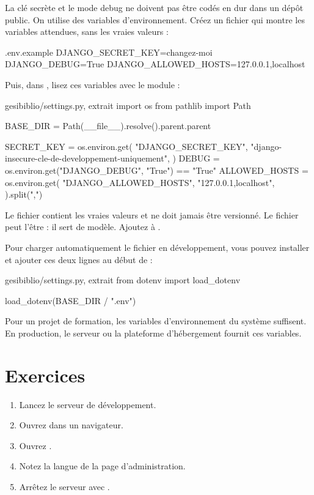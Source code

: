 La clé secrète et le mode debug ne doivent pas être codés en dur dans un dépôt
public. On utilise des variables d'environnement. Créez un fichier
 qui montre les variables attendues, sans les vraies valeurs :

\begin{codebox}[tree]{.env.example}
DJANGO_SECRET_KEY=changez-moi
DJANGO_DEBUG=True
DJANGO_ALLOWED_HOSTS=127.0.0.1,localhost
\end{codebox}

Puis, dans , lisez ces variables avec le module  :

\begin{codebox}[python]{gesibiblio/settings.py, extrait}
import os
from pathlib import Path

BASE_DIR = Path(__file__).resolve().parent.parent

SECRET_KEY = os.environ.get(
    "DJANGO_SECRET_KEY",
    "django-insecure-cle-de-developpement-uniquement",
)
DEBUG = os.environ.get("DJANGO_DEBUG", "True") == "True"
ALLOWED_HOSTS = os.environ.get(
    "DJANGO_ALLOWED_HOSTS",
    "127.0.0.1,localhost",
).split(",")
\end{codebox}

\begin{attention}
Le fichier  contient les vraies valeurs et ne doit jamais être
versionné. Le fichier  peut l'être : il sert de modèle. Ajoutez
 à .
\end{attention}

\begin{bonne}
Pour charger automatiquement le fichier  en développement, vous pouvez
installer  et ajouter ces deux lignes au début de
 :
\begin{codebox}[python]{gesibiblio/settings.py, extrait}
from dotenv import load_dotenv

load_dotenv(BASE_DIR / ".env")
\end{codebox}
Pour un projet de formation, les variables d'environnement du système suffisent.
En production, le serveur ou la plateforme d'hébergement fournit ces variables.
\end{bonne}

\section{Exercices}

\begin{exercice}
\begin{enumerate}
  \item Lancez le serveur de développement.
  \item Ouvrez  dans un navigateur.
  \item Ouvrez .
  \item Notez la langue de la page d'administration.
  \item Arrêtez le serveur avec .
\end{enumerate}
\end{exercice}


